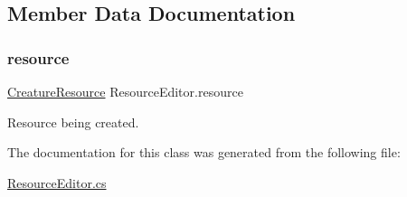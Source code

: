 \subsection{Member Data Documentation}
\mbox{\label{class_resource_editor_a523c5ec92b05df42505540a92df1e441}} 
\subsubsection{\texorpdfstring{resource}{resource}}
{\footnotesize\ttfamily \mbox{\hyperlink{class_creature_resource}{Creature\+Resource}} Resource\+Editor.\+resource}



Resource being created. 



The documentation for this class was generated from the following file\+:\begin{DoxyCompactItemize}
\item 
\mbox{\hyperlink{_resource_editor_8cs}{Resource\+Editor.\+cs}}\end{DoxyCompactItemize}
